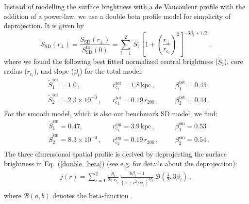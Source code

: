 \documentclass[10pt,aps,pra,reprint,amsmath,amsfonts,amssymb,showpacs,nofootinbib,floatfix]{revtex4-1}
\newcommand{\rmn}{\mathrm}
\newcommand{\sd}{\rmn{SD}}
\newcommand{\rvir}{r_{200}}
\begin{document}
Instead of modelling the surface brightness with a de Vaucouleur
profile with the addition of a power-law, we use a double beta profile
model for simplicity of deprojection. It is given by
\begin{equation}
\tilde{S}_\sd (r_\bot) = \frac{S_\sd (r_\bot)}{S_\rmn{SD}^\rmn{tot}(0)} = 
\sum_{i=1}^2 \,\tilde{S}_i\, 
\left[1 + \left( \frac{r_\bot}{r_{\mathrm{c}_i}}\right)^2\right]
^{-3\beta_i + 1/2}\,,
\label{double_beta}
\end{equation}
where we found the following best fitted normalized central brightness
($\tilde{S}_i$), core radius ($r_{\mathrm{c}_i}$), and slope
($\beta_i$) for the total model:
\begin{align}
&\tilde{S}_1^\rmn{tot} = 1.0\,,
&&r_{\mathrm{c}_1}^\rmn{tot} = 1.8\,\rmn{kpc}\,,
&&&\beta_1^\rmn{tot} = 0.45\, \nonumber\\
&\tilde{S}_2^\rmn{tot} = 2.3\times10^{-3}\,,
&&r_{\mathrm{c}_2}^\rmn{tot} = 0.19\,\rvir\,,
&&&\beta_2^\rmn{tot} = 0.44\,.\nonumber\\
& && &&&
\label{fit_spatial_IR}
\end{align}
For the smooth model, which is also our benchmark SD model, we find:
\begin{align}
&\tilde{S}_1^\rmn{sm}=0.47,\,
&&r_{\mathrm{c}_1}^\rmn{sm}=3.9\,\rmn{kpc}\,,
&&&\beta_1^\rmn{sm}=0.53 \,\nonumber\\
&\tilde{S}_2^\rmn{sm}=8.3\times10^{-4}\,,
&&r_{\mathrm{c}_2}^\rmn{sm}=0.19\,\rvir\,,
&&&\beta_2^\rmn{sm}=0.54\,.\nonumber\\
& && &&&
\label{fit_spatial_IR_sm}
\end{align}
The three dimensional spatial profile is derived by deprojecting the
surface brightness in Eq.~(\ref{double_beta}) (see
e.g. \cite{2004A&A...413...17P} for details about the deprojection):
\begin{eqnarray}
  j(r)  = \sum_{i=1}^2 \frac{\tilde{S}_i}{2\pi\,r_{\mathrm{c}_i}}\,
  \frac{6 \beta_i - 1}{\left(1 + r^2/r^2_{\mathrm{c}_i}\right)^{3\beta_i}}\,
  \mathcal{B}\left(\frac{1}{2},3\beta_i\right)\,,\nonumber\\
\end{eqnarray}
where $\mathcal{B}(a,b)$ denotes the beta-function
\cite{1965hmfw.book.....A}.
\end{document}
